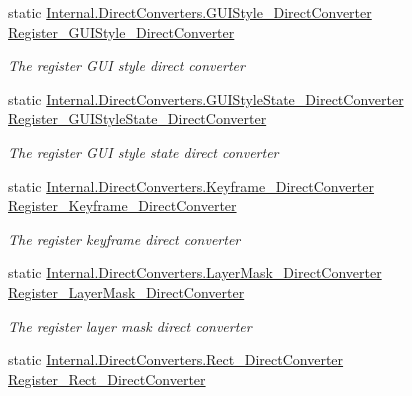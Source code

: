 \begin{DoxyCompactItemize}
static \hyperlink{class_full_serializer_1_1_internal_1_1_direct_converters_1_1_g_u_i_style___direct_converter}{Internal.\+Direct\+Converters.\+G\+U\+I\+Style\+\_\+\+Direct\+Converter} \hyperlink{class_full_serializer_1_1fs_converter_registrar_afa11e5e658aeec293b54117312b82bc6}{Register\+\_\+\+G\+U\+I\+Style\+\_\+\+Direct\+Converter}
\begin{DoxyCompactList}\small\item\em The register G\+UI style direct converter \end{DoxyCompactList}\item 
static \hyperlink{class_full_serializer_1_1_internal_1_1_direct_converters_1_1_g_u_i_style_state___direct_converter}{Internal.\+Direct\+Converters.\+G\+U\+I\+Style\+State\+\_\+\+Direct\+Converter} \hyperlink{class_full_serializer_1_1fs_converter_registrar_ad2678c0d4d05b63e7b6b52949914fc1c}{Register\+\_\+\+G\+U\+I\+Style\+State\+\_\+\+Direct\+Converter}
\begin{DoxyCompactList}\small\item\em The register G\+UI style state direct converter \end{DoxyCompactList}\item 
static \hyperlink{class_full_serializer_1_1_internal_1_1_direct_converters_1_1_keyframe___direct_converter}{Internal.\+Direct\+Converters.\+Keyframe\+\_\+\+Direct\+Converter} \hyperlink{class_full_serializer_1_1fs_converter_registrar_ac022ba6fbcff285756dd22d1d87efe3c}{Register\+\_\+\+Keyframe\+\_\+\+Direct\+Converter}
\begin{DoxyCompactList}\small\item\em The register keyframe direct converter \end{DoxyCompactList}\item 
static \hyperlink{class_full_serializer_1_1_internal_1_1_direct_converters_1_1_layer_mask___direct_converter}{Internal.\+Direct\+Converters.\+Layer\+Mask\+\_\+\+Direct\+Converter} \hyperlink{class_full_serializer_1_1fs_converter_registrar_a580adc5799fba498443d42473504c9c2}{Register\+\_\+\+Layer\+Mask\+\_\+\+Direct\+Converter}
\begin{DoxyCompactList}\small\item\em The register layer mask direct converter \end{DoxyCompactList}\item 
static \hyperlink{class_full_serializer_1_1_internal_1_1_direct_converters_1_1_rect___direct_converter}{Internal.\+Direct\+Converters.\+Rect\+\_\+\+Direct\+Converter} \hyperlink{class_full_serializer_1_1fs_converter_registrar_a96811fcdaac71a24118248baef3a7c33}{Register\+\_\+\+Rect\+\_\+\+Direct\+Converter}

\end{DoxyCompactItemize}
